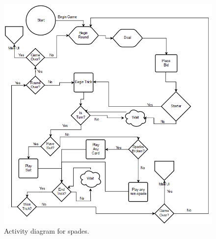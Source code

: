 	\begin{figure}
		\begin{center}
		\includegraphics{graphics/logicDiagram}
		\caption{Activity diagram for spades.}
		\label{Figure 1}
		\end{center}
	\end{figure}
	